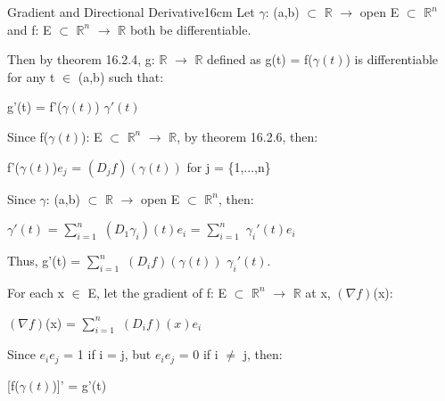     \vspace{0.5cm}



    \begin{definition}{Gradient and Directional Derivative}{16cm}
        Let $\gamma$: (a,b) $\subset$ $\mathbb{R}$
                    $\rightarrow$ open E $\subset$ $\mathbb{R}^n$
        and f: E $\subset$ $\mathbb{R}^n$
                $\rightarrow$ $\mathbb{R}$ both be differentiable.

        Then by {\color{red} theorem 16.2.4},
        g: $\mathbb{R}$ $\rightarrow$ $\mathbb{R}$ 
        defined as g(t) = f($\gamma(t)$)
        is differentiable for any t $\in$ (a,b) such that:
        
        \hspace{0.5cm}
        g'(t) = f'($\gamma(t)$) $\gamma'(t)$

        Since f($\gamma(t)$): E $\subset$ $\mathbb{R}^n$ $\rightarrow$ $\mathbb{R}$,
        by {\color{red} theorem 16.2.6}, then:
        
        \hspace{0.5cm}
        f'($\gamma(t)$)$e_j$ = $(D_jf)(\gamma(t))$
        for j = \{1,...,n\}

        Since $\gamma$: (a,b) $\subset$ $\mathbb{R}$
                    $\rightarrow$ open E $\subset$ $\mathbb{R}^n$,
        then:

        \hspace{0.5cm}
        $\gamma'(t)$
        = $\sum_{i=1}^n$ $(D_1\gamma_i)(t)e_i$
        = $\sum_{i=1}^n$ $\gamma_i'(t)e_i$

        Thus,
        g'(t)
        = $\sum_{i=1}^n$ $(D_if)(\gamma(t))$ $\gamma_i'(t)$.

        \vspace{0.5cm}

        For each x $\in$ E, let the {\color{lblue} gradient} of
        f: E $\subset$ $\mathbb{R}^n$ $\rightarrow$ $\mathbb{R}$ at x,
        $(\nabla f)$(x):
        
        \hspace{0.5cm}
        $(\nabla f)$(x) = $\sum_{i=1}^n$ $(D_if)(x)e_i$

        \vspace{0.5cm}

        Since $e_ie_j$ = 1 if i = j, but $e_ie_j$ = 0 if i $\not =$ j, then:

        \hspace{0.5cm}
        [f($\gamma(t)$)]' = g'(t)
        

\end{definition}
